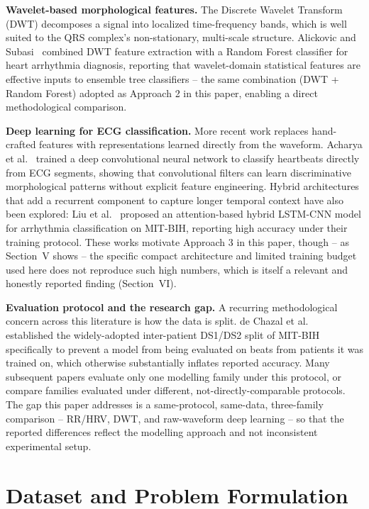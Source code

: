 \documentclass[conference]{IEEEtran}
\begin{document}
\textbf{Wavelet-based morphological features.} The Discrete Wavelet
Transform (DWT) decomposes a signal into localized time-frequency bands,
which is well suited to the QRS complex's non-stationary, multi-scale
structure. Alickovic and Subasi~\cite{alickovic2016medical} combined DWT
feature extraction with a Random Forest classifier for heart arrhythmia
diagnosis, reporting that wavelet-domain statistical features are
effective inputs to ensemble tree classifiers -- the same combination
(DWT + Random Forest) adopted as Approach 2 in this paper, enabling a
direct methodological comparison.

\textbf{Deep learning for ECG classification.} More recent work replaces
hand-crafted features with representations learned directly from the
waveform. Acharya et al.~\cite{acharya2017deep} trained a deep
convolutional neural network to classify heartbeats directly from ECG
segments, showing that convolutional filters can learn discriminative
morphological patterns without explicit feature engineering. Hybrid
architectures that add a recurrent component to capture longer temporal
context have also been explored: Liu et al.~\cite{liu2019attention}
proposed an attention-based hybrid LSTM-CNN model for arrhythmia
classification on MIT-BIH, reporting high accuracy under their training
protocol. These works motivate Approach 3 in this paper, though -- as
Section~V shows -- the specific compact architecture and limited training
budget used here does not reproduce such high numbers, which is itself a
relevant and honestly reported finding (Section~VI).

\textbf{Evaluation protocol and the research gap.} A recurring
methodological concern across this literature is how the data is split.
de Chazal et al.~\cite{dechazal2004automatic} established the
widely-adopted inter-patient DS1/DS2 split of MIT-BIH specifically to
prevent a model from being evaluated on beats from patients it was trained
on, which otherwise substantially inflates reported accuracy. Many
subsequent papers evaluate only one modelling family under this protocol,
or compare families evaluated under different, not-directly-comparable
protocols. The gap this paper addresses is a same-protocol, same-data,
three-family comparison -- RR/HRV, DWT, and raw-waveform deep learning --
so that the reported differences reflect the modelling approach and not
inconsistent experimental setup.

\section{Dataset and Problem Formulation}
\end{document}
